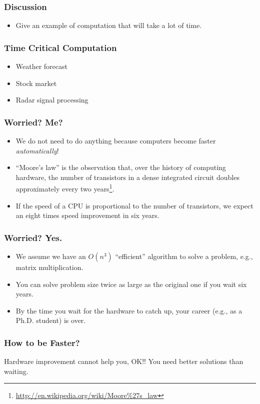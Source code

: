 \documentclass{beamer}
\begin{document}
\begin{CJK}{UTF8}{bsmi}
\begin{frame}
\frametitle{Discussion} \Large 
\begin{itemize}
\item Give an example of computation that will take a lot of time.
\end{itemize}
\end{frame}

\begin{frame}
\frametitle{Time Critical Computation}
\begin{itemize}
\item Weather forecast
\item Stock market
\item Radar signal processing
\end{itemize}
\end{frame}

\begin{frame}
\frametitle{Worried? Me?}
\begin{itemize}
\item We do not need to do anything because computers become faster
  {\em automatically}!
\item ``Moore's law'' is the observation that, over the history of
  computing hardware, the number of transistors in a dense integrated
  circuit doubles approximately every two years\footnote{\url{http://en.wikipedia.org/wiki/Moore\%27s_law}}.
\item If the speed of a CPU is proportional to the number of
  transistors, we expect an eight times speed improvement in six
  years.
\end{itemize}
\end{frame}

\begin{frame}
\frametitle{Worried? Yes.}
\begin{itemize}
\item We assume we have an $O(n^3)$ ``efficient'' algorithm to solve a
  problem, e.g., matrix multiplication.
\item You can solve problem size twice as large as the original one if
  you wait six years.
\item By the time you wait for the hardware to catch up, your career
  (e.g., as a Ph.D. student) is over.
\end{itemize}
\end{frame}

\begin{frame}
\frametitle{How to be Faster?}  \Huge Hardware improvement cannot help
you, OK!!  You need better solutions than waiting.
\end{frame}


\end{CJK}
\end{document}
